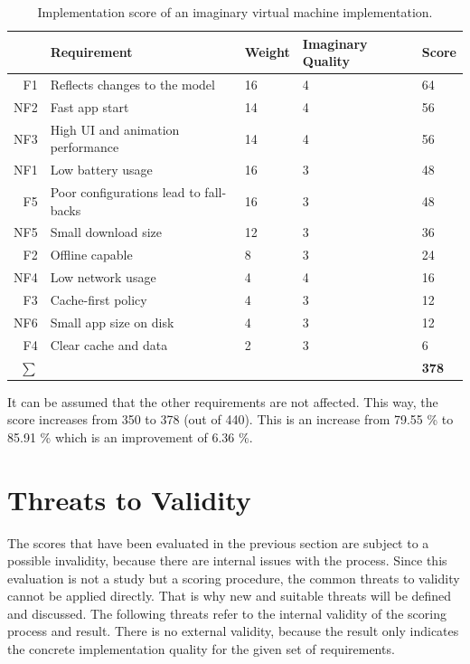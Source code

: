 \begin{table}[h]
	\begin{center}
		\begin{tabular}{r|l|l|l|l}
			& Requirement       & Weight & Imaginary Quality & Score \\ \hline
			F1 & Reflects changes to the model    & 16 & 4 & 64    \\
			NF2 & Fast app start    & 14 & 4 & 56   \\
			NF3 & High UI and animation performance      & 14    & 4  & 56 \\
			NF1 & Low battery usage            &16  & 3  & 48   \\
			F5 & Poor configurations lead to fall-backs      & 16 & 3 & 48    \\
			NF5 & Small download size    & 12 & 3 & 36    \\
			F2 & Offline capable       & 8 & 3 & 24   \\
			NF4 & Low network usage      & 4    & 4  & 16 \\
			F3 & Cache-first policy       & 4  & 3 & 12  \\
			NF6 & Small app size on disk      & 4  & 3 & 12  \\
			F4 & Clear cache and data       & 2 & 3   & 6   
			\\ \hline
			$\sum$ &    & &    &   \textbf{378}
		\end{tabular}
	\end{center}
	\caption{Implementation score of an imaginary virtual machine implementation.}
	\label{table:implementationscorevirtualmachineapproachresults}
\end{table}

It can be assumed that the other requirements are not affected.
This way, the score increases from 350 to 378 (out of 440).
This is an increase from 79.55 \% to 85.91 \% which is an improvement of 6.36 \%.

\section{Threats to Validity}

The scores that have been evaluated in the previous section are subject to a possible invalidity, because there are internal issues with the process.
Since this evaluation is not a study but a scoring procedure, the common threats to validity cannot be applied directly.
That is why new and suitable threats will be defined and discussed.
The following threats refer to the internal validity of the scoring process and result.
There is no external validity, because the result only indicates the concrete implementation quality for the given set of requirements.

